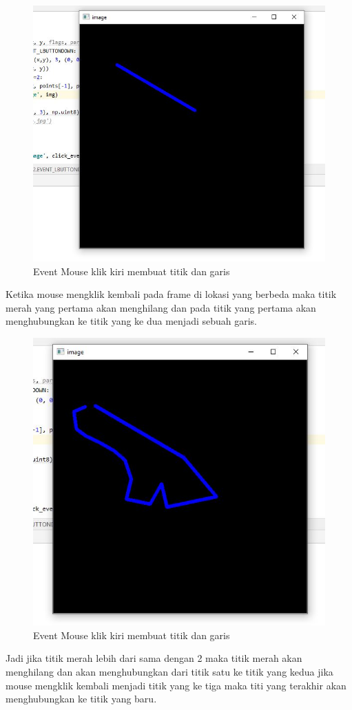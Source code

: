 \newpage
\begin{figure}[ht]
\centering
\includegraphics[scale=0.7]{figures/2,23,1.jpg}
\caption{Event Mouse klik kiri membuat titik dan garis}
\label{contoh}
\end{figure}
Ketika mouse mengklik kembali pada frame di lokasi yang berbeda maka titik merah yang pertama akan menghilang dan pada titik yang pertama akan menghubungkan ke titik yang ke dua menjadi sebuah garis.

\newpage
\begin{figure}[ht]
\centering
\includegraphics[scale=0.7]{figures/2,23,2.jpg}
\caption{Event Mouse klik kiri membuat titik dan garis}
\label{contoh}
\end{figure}
Jadi jika titik merah lebih dari sama dengan 2 maka titik merah akan menghilang dan akan menghubungkan dari titik satu ke titik yang kedua jika mouse mengklik kembali menjadi titik yang ke tiga maka titi yang terakhir akan menghubungkan ke titik yang baru.



